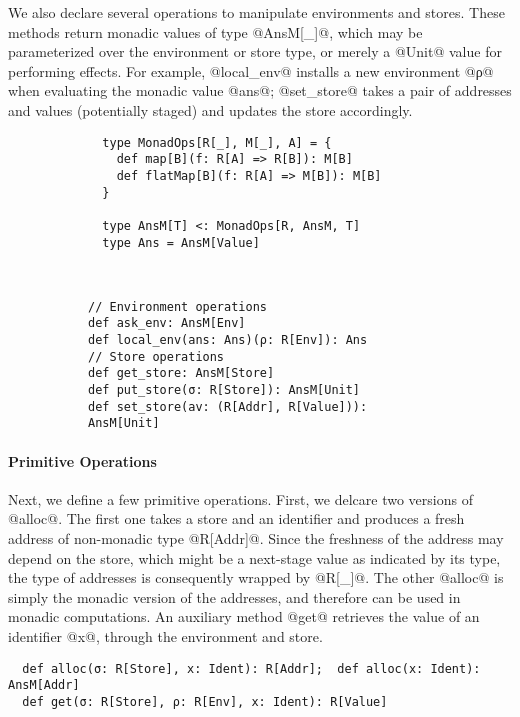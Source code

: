 We also declare several operations to manipulate environments and
stores. These methods return monadic values of type @AnsM[_]@, which
may be parameterized over the environment or store type, or merely a @Unit@
value for performing effects. For example, @local_env@ installs a new environment
@ρ@ when evaluating the monadic value @ans@; @set_store@ takes a pair of
addresses and values (potentially staged) and updates the store accordingly.

\begin{figure}[h!]
  \centering
  \begin{subfigure}[b]{0.45\textwidth}
    \begin{lstlisting}
  type MonadOps[R[_], M[_], A] = {
    def map[B](f: R[A] => R[B]): M[B]
    def flatMap[B](f: R[A] => M[B]): M[B]
  }
  
  type AnsM[T] <: MonadOps[R, AnsM, T]
  type Ans = AnsM[Value]
    \end{lstlisting}
  \end{subfigure}
  ~
  \begin{subfigure}[b]{0.55\textwidth}
    \begin{lstlisting}
// Environment operations
def ask_env: AnsM[Env]
def local_env(ans: Ans)(ρ: R[Env]): Ans
// Store operations
def get_store: AnsM[Store]
def put_store(σ: R[Store]): AnsM[Unit]
def set_store(av: (R[Addr], R[Value])): AnsM[Unit]
    \end{lstlisting}
  \end{subfigure}
\end{figure}
\vspace{-1em}

\paragraph{Primitive Operations} Next, we define a few primitive operations.
First, we delcare two versions of @alloc@. The first one takes a store and an
identifier and produces a fresh address of non-monadic type @R[Addr]@. Since
the freshness of the address may depend on the store, which might be a
next-stage value as indicated by its type, the type of addresses is
consequently wrapped by @R[_]@. The other @alloc@ is simply the monadic version
of the addresses, and therefore can be used in monadic computations.
An auxiliary method @get@ retrieves the value of an identifier @x@, through the
environment and store. 
\begin{lstlisting}
  def alloc(σ: R[Store], x: Ident): R[Addr];  def alloc(x: Ident): AnsM[Addr]
  def get(σ: R[Store], ρ: R[Env], x: Ident): R[Value]
\end{lstlisting}

